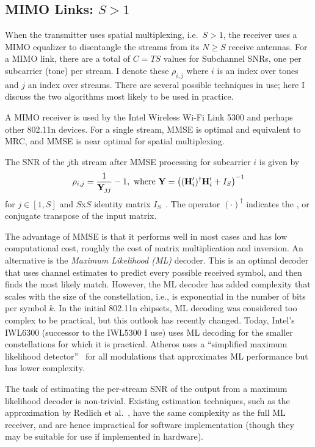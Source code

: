 \subsection{MIMO Links: $S>1$}
When the transmitter uses spatial multiplexing, i.e.\ $S>1$, the receiver uses a MIMO equalizer to disentangle the streams from its $N\geq S$ receive antennas. For a MIMO link, there are a total of $C=TS$ values for Subchannel SNRs, one per subcarrier (tone) per stream. I denote these $\rho_{i,j}$ where $i$ is an index over tones and $j$ an index over streams. There are several possible techniques in use; here I discuss the two algorithms most likely to be used in practice.

A  MIMO receiver is used by the Intel Wireless Wi-Fi Link 5300 and perhaps other 802.11n devices. For a single stream, MMSE is optimal and equivalent to MRC, and MMSE is near optimal for spatial multiplexing.

The SNR of the $j$th stream after MMSE processing for subcarrier $i$ is given by
\begin{equation}
\centering
\label{eq:mmse_snr}
\rho_{i,j} = \frac{1}{\mathbf{Y}_{jj}}-1, \text{ where }
\mathbf{Y} = \left((\mathbf{H}'_i)^\dagger \mathbf{H}'_i+I_S\right)^{-1}
\end{equation}
for $j \in [1,S]$ and $S$x$S$ identity matrix $I_S$~\cite{Tse}. The operator $(\cdot)^\dagger$ indicates the , or conjugate transpose of the input matrix.

The advantage of MMSE is that it performs well in most cases and has low computational cost, roughly the cost of matrix multiplication and inversion. An alternative is the \emph{Maximum Likelihood (ML)} decoder. This is an optimal decoder that uses channel estimates to predict every possible received symbol, and then finds the most likely match. However, the ML decoder has added complexity that scales with the size of the constellation, i.e., is exponential in the number of bits per symbol $k$. In the initial 802.11n chipsets, ML decoding was considered too complex to be practical, but this outlook has recently changed. Today, Intel's IWL6300 (successor to the IWL5300 I use) uses ML decoding for the smaller constellations for which it is practical. Atheros uses a ``simplified maximum likelihood detector''~\cite{ar6004,Atheros_11nTechPaper} for all modulations that approximates ML performance but has lower complexity.

The task of estimating the per-stream SNR of the output from a maximum likelihood decoder is non-trivial. Existing estimation techniques, such as the approximation by Redlich et al.~\cite{Redlich_MLSNR}, have the same complexity as the full ML receiver, and are hence impractical for software implementation (though they may be suitable for use if implemented in hardware).

